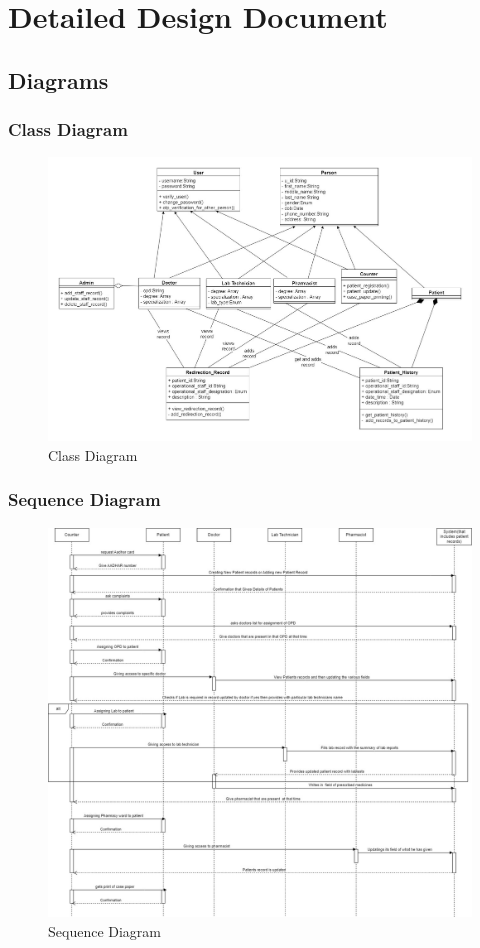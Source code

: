 \chapter{Detailed Design Document}
\section{Diagrams}
\subsection{Class Diagram}
\begin{figure}[h!]
    \centering
    \includegraphics[width=1.1\textwidth]{Class Diagram.jpeg}
    \caption{Class Diagram}
\end{figure}
\subsection{Sequence Diagram}
\begin{figure}[h!]
    \centering
    \includegraphics[width=1.1\textwidth]{sequence.jpeg}
    \caption{Sequence Diagram}
\end{figure}
\clearpage
